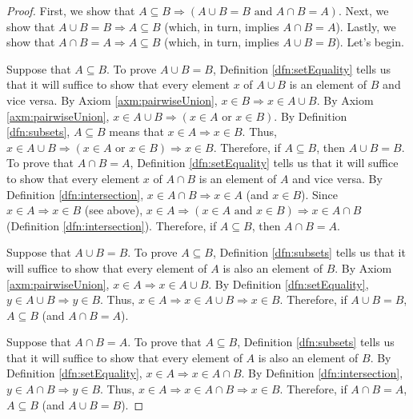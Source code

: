 \documentclass[../main.tex]{subfiles}
\begin{document}
\begin{enumerate}[ref={\thesection.\arabic*}]
    \begin{proof}
        First, we show that $A\subseteq B \Longrightarrow (A\cup B=B\text{ and }A\cap B=A)$. Next, we show that $A\cup B=B \Longrightarrow A\subseteq B$ (which, in turn, implies $A\cap B=A$). Lastly, we show that $A\cap B=A \Longrightarrow A\subseteq B$ (which, in turn, implies $A\cup B=B$). Let's begin.\par
        Suppose that $A\subseteq B$. To prove $A\cup B=B$, Definition \ref{dfn:setEquality} tells us that it will suffice to show that every element $x$ of $A\cup B$ is an element of $B$ and vice versa. By Axiom \ref{axm:pairwiseUnion}, $x\in B \Longrightarrow x\in A\cup B$. By Axiom \ref{axm:pairwiseUnion}, $x\in A\cup B \Longrightarrow (x\in A\text{ or }x\in B)$. By Definition \ref{dfn:subsets}, $A\subseteq B$ means that $x\in A \Longrightarrow x\in B$. Thus, $x\in A\cup B \Longrightarrow (x\in A\text{ or }x\in B) \Longrightarrow x\in B$. Therefore, if $A\subseteq B$, then $A\cup B=B$. To prove that $A\cap B=A$, Definition \ref{dfn:setEquality} tells us that it will suffice to show that every element $x$ of $A\cap B$ is an element of $A$ and vice versa. By Definition \ref{dfn:intersection}, $x\in A\cap B \Longrightarrow x\in A$ (and $x\in B$). Since $x\in A \Longrightarrow x\in B$ (see above), $x\in A \Longrightarrow (x\in A\text{ and }x\in B) \Longrightarrow x\in A\cap B$ (Definition \ref{dfn:intersection}). Therefore, if $A\subseteq B$, then $A\cap B=A$.\par
        Suppose that $A\cup B=B$. To prove $A\subseteq B$, Definition \ref{dfn:subsets} tells us that it will suffice to show that every element of $A$ is also an element of $B$. By Axiom \ref{axm:pairwiseUnion}, $x\in A \Longrightarrow x\in A\cup B$. By Definition \ref{dfn:setEquality}, $y\in A\cup B \Longrightarrow y\in B$. Thus, $x\in A \Longrightarrow x\in A\cup B \Longrightarrow x\in B$. Therefore, if $A\cup B=B$, $A\subseteq B$ (and $A\cap B=A$).\par
        Suppose that $A\cap B=A$. To prove that $A\subseteq B$, Definition \ref{dfn:subsets} tells us that it will suffice to show that every element of $A$ is also an element of $B$. By Definition \ref{dfn:setEquality}, $x\in A \Longrightarrow x\in A\cap B$. By Definition \ref{dfn:intersection}, $y\in A\cap B \Longrightarrow y\in B$. Thus, $x\in A \Longrightarrow x\in A\cap B \Longrightarrow x\in B$. Therefore, if $A\cap B=A$, $A\subseteq B$ (and $A\cup B=B$).
    \end{proof}
\end{enumerate}
\end{document}
